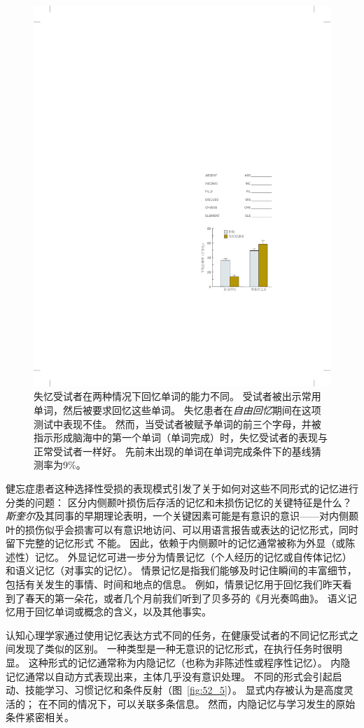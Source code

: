 \begin{figure}[htbp]
	\centering
	\includegraphics[width=0.5\linewidth]{chap52/fig_52_4}
	\caption{失忆受试者在两种情况下回忆单词的能力不同。
		受试者被出示常用单词，然后被要求回忆这些单词。
		失忆患者在\textit{自由回忆}期间在这项测试中表现不佳。
		然而，当受试者被赋予单词的前三个字母，并被指示形成脑海中的第一个单词（单词完成）时，失忆受试者的表现与正常受试者一样好。
		先前未出现的单词在单词完成条件下的基线猜测率为9\%\cite{squire1987memory}。}
	\label{fig:52_4}
\end{figure}


健忘症患者这种选择性受损的表现模式引发了关于如何对这些不同形式的记忆进行分类的问题：
区分内侧颞叶损伤后存活的记忆和未损伤记忆的关键特征是什么？
\textit{斯奎尔}及其同事的早期理论表明，一个关键因素可能是有意识的意识——对内侧颞叶的损伤似乎会损害可以有意识地访问、可以用语言报告或表达的记忆形式，同时留下完整的记忆形式 不能。
因此，依赖于内侧颞叶的记忆通常被称为外显（或陈述性）记忆。
外显记忆可进一步分为情景记忆（个人经历的记忆或自传体记忆）和语义记忆（对事实的记忆）。
情景记忆是指我们能够及时记住瞬间的丰富细节，包括有关发生的事情、时间和地点的信息。
例如，情景记忆用于回忆我们昨天看到了春天的第一朵花，或者几个月前我们听到了贝多芬的《月光奏鸣曲》。
语义记忆用于回忆单词或概念的含义，以及其他事实。


认知心理学家通过使用记忆表达方式不同的任务，在健康受试者的不同记忆形式之间发现了类似的区别。
一种类型是一种无意识的记忆形式，在执行任务时很明显。
这种形式的记忆通常称为内隐记忆（也称为非陈述性或程序性记忆）。
内隐记忆通常以自动方式表现出来，主体几乎没有意识处理。
不同的形式会引起启动、技能学习、习惯记忆和条件反射（图~\ref{fig:52_5}）。
显式内存被认为是高度灵活的；
在不同的情况下，可以关联多条信息。
然而，内隐记忆与学习发生的原始条件紧密相关。


